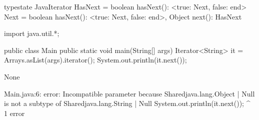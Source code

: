 \begin{code}
typestate JavaIterator {
    HasNext = {
        boolean hasNext(): <true: Next, false: end>
    }
    Next = {
        boolean hasNext(): <true: Next, false: end>,
        Object next(): HasNext
    }
}\end{code}

\begin{code}
import java.util.*;

public class Main {
	public static void main(String[] args) {
    Iterator<String> it = Arrays.asList(args).iterator();
    System.out.println(it.next());
	}
}\end{code}

\lstset{language=,caption=Mungo's output}
\begin{code}
None
\end{code}

\lstset{language=,caption=Our tool's output}
\begin{code}
Main.java:6: error: Incompatible parameter because Shared{java.lang.Object} | Null is not a subtype of Shared{java.lang.String} | Null
    System.out.println(it.next());
                              ^
1 error
\end{code}

